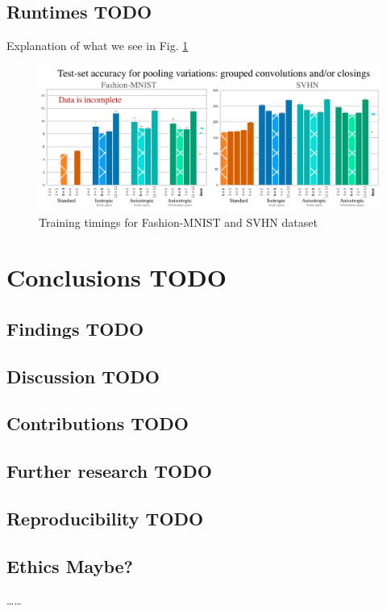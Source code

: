 \documentclass[a4paper, 12pt]{report}
\def\comment#1{\color{red}#1\color{black}}
\begin{document}
\section{Runtimes  \comment{TODO}}
\comment{Explanation of what we see in Fig. \ref{fig:res-timings}}
\begin{figure}[ht!]
	\center
  \includegraphics[width=1\textwidth]{figures/timings.png}
  \caption{Training timings for Fashion-MNIST and SVHN dataset}
  \label{fig:res-timings}
\end{figure}
\chapter{Conclusions \comment{TODO}}

\section{Findings \comment{TODO}}
\section{Discussion \comment{TODO}}

\newpage
\section{Contributions \comment{TODO}}
\section{Further research \comment{TODO}}

\section{Reproducibility \comment{TODO}}
\section{Ethics \comment{Maybe?}}
\comment{\ldots\ldots}
\end{document}
